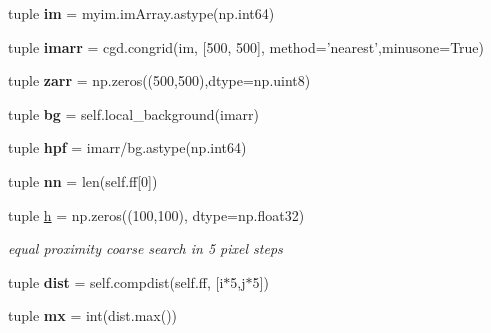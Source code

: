 \begin{DoxyCompactItemize}
\item 
\hypertarget{classmyDetector_1_1myDetector_ab5ac48a33f04c3c9644fe91a75d489f1}{tuple {\bfseries im} = myim.\-im\-Array.\-astype(np.\-int64)}\label{classmyDetector_1_1myDetector_ab5ac48a33f04c3c9644fe91a75d489f1}

\item 
\hypertarget{classmyDetector_1_1myDetector_a410f74814a76fe6a1def53b340335fa7}{tuple {\bfseries imarr} = cgd.\-congrid(im, \mbox{[}500, 500\mbox{]}, method='nearest',minusone=True)}\label{classmyDetector_1_1myDetector_a410f74814a76fe6a1def53b340335fa7}

\item 
\hypertarget{classmyDetector_1_1myDetector_a5073be601ea77b2b69921ccf0de09f95}{tuple {\bfseries zarr} = np.\-zeros((500,500),dtype=np.\-uint8)}\label{classmyDetector_1_1myDetector_a5073be601ea77b2b69921ccf0de09f95}

\item 
\hypertarget{classmyDetector_1_1myDetector_aab7c6d5294ad55f8124b65bbfbb2a5c8}{tuple {\bfseries bg} = self.\-local\-\_\-background(imarr)}\label{classmyDetector_1_1myDetector_aab7c6d5294ad55f8124b65bbfbb2a5c8}

\item 
\hypertarget{classmyDetector_1_1myDetector_ae986d8133b5510b9414a885e05b1bbf0}{tuple {\bfseries hpf} = imarr/bg.\-astype(np.\-int64)}\label{classmyDetector_1_1myDetector_ae986d8133b5510b9414a885e05b1bbf0}

\item 
\hypertarget{classmyDetector_1_1myDetector_a386c22e4c8877c163e1c1855ac602d08}{tuple {\bfseries nn} = len(self.\-ff\mbox{[}0\mbox{]})}\label{classmyDetector_1_1myDetector_a386c22e4c8877c163e1c1855ac602d08}

\item 
tuple \hyperlink{classmyDetector_1_1myDetector_afcb68bb2db834b6bb8c53cb194cf92bf}{h} = np.\-zeros((100,100), dtype=np.\-float32)
\begin{DoxyCompactList}\small\item\em equal proximity coarse search in 5 pixel steps \end{DoxyCompactList}\item 
\hypertarget{classmyDetector_1_1myDetector_a043b9a79c751351b6d34bcf8f0d415ca}{tuple {\bfseries dist} = self.\-compdist(self.\-ff, \mbox{[}i$\ast$5,j$\ast$5\mbox{]})}\label{classmyDetector_1_1myDetector_a043b9a79c751351b6d34bcf8f0d415ca}

\item 
\hypertarget{classmyDetector_1_1myDetector_a7527caeb614bc6fe04eeb93654826835}{tuple {\bfseries mx} = int(dist.\-max())}\label{classmyDetector_1_1myDetector_a7527caeb614bc6fe04eeb93654826835}


\end{DoxyCompactItemize}
